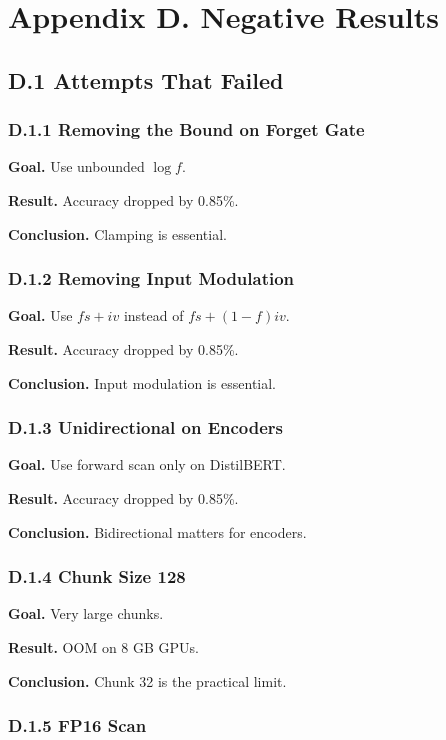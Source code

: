 \section{Appendix D. Negative Results}

\subsection{D.1 Attempts That Failed}

\subsubsection{D.1.1 Removing the Bound on Forget Gate}

\textbf{Goal.} Use unbounded $\log f$.

\textbf{Result.} Accuracy dropped by 0.85\%.

\textbf{Conclusion.} Clamping is essential.

\subsubsection{D.1.2 Removing Input Modulation}

\textbf{Goal.} Use $f s + i v$ instead of $f s + (1-f) i v$.

\textbf{Result.} Accuracy dropped by 0.85\%.

\textbf{Conclusion.} Input modulation is essential.

\subsubsection{D.1.3 Unidirectional on Encoders}

\textbf{Goal.} Use forward scan only on DistilBERT.

\textbf{Result.} Accuracy dropped by 0.85\%.

\textbf{Conclusion.} Bidirectional matters for encoders.

\subsubsection{D.1.4 Chunk Size 128}

\textbf{Goal.} Very large chunks.

\textbf{Result.} OOM on 8 GB GPUs.

\textbf{Conclusion.} Chunk 32 is the practical limit.

\subsubsection{D.1.5 FP16 Scan}

